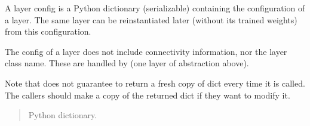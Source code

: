 \documentclass[letterpaper,10pt,english]{sphinxmanual}
\begin{document}
\begin{fulllineitems}
\begin{fulllineitems}
\sphinxAtStartPar
A layer config is a Python dictionary (serializable)
containing the configuration of a layer.
The same layer can be reinstantiated later
(without its trained weights) from this configuration.

\sphinxAtStartPar
The config of a layer does not include connectivity
information, nor the layer class name. These are handled
by  (one layer of abstraction above).

\sphinxAtStartPar
Note that  does not guarantee to return a fresh copy of
dict every time it is called. The callers should make a copy of the
returned dict if they want to modify it.
\begin{quote}\begin{description}
\sphinxAtStartPar
Python dictionary.

\end{description}\end{quote}

\end{fulllineitems}


\begin{fulllineitems}
\label{\detokenize{beyondml.tflow.layers:beyondml.tflow.layers.MultiMaskedConv2D.MultiMaskedConv2D.kernel_size}}
\pysigstartsignatures
{}
\pysigstopsignatures
\end{fulllineitems}


\begin{fulllineitems}
\label{\detokenize{beyondml.tflow.layers:beyondml.tflow.layers.MultiMaskedConv2D.MultiMaskedConv2D.set_masks}}
\pysigstartsignatures
{}
\pysigstopsignatures
\end{fulllineitems}


\end{fulllineitems}
\end{document}
